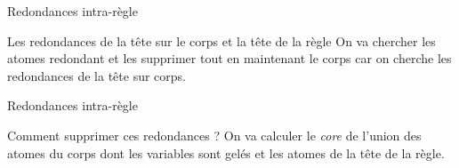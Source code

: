 

    
    
    
    

    
    

\begin{frame}{Redondances intra-règle}

    
    \begin{block}{Les redondances de la tête sur le corps et la tête de la règle }
    On va chercher les atomes redondant et les supprimer tout en maintenant le corps car on cherche les redondances de la tête sur corps.
    \end{block}
\end{frame}

\begin{frame}{Redondances intra-règle}
   
    \begin{block}{Comment supprimer ces redondances ? }
        On va calculer le \textit{core} de l'union des atomes du corps dont les variables sont gelés et les atomes de la tête de la règle. 
    \end{block}
    
  
    
\end{frame}

